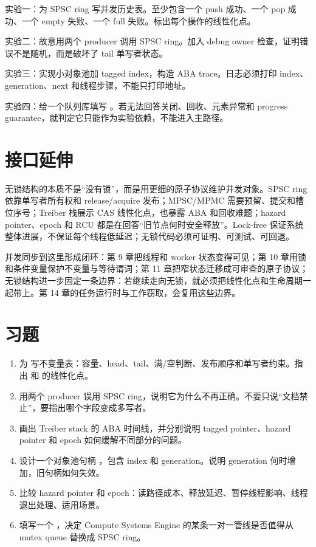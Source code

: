 \begin{exercisebox}
实验一：为 SPSC ring 写并发历史表。至少包含一个 push 成功、一个 pop 成功、一个 empty 失败、一个 full 失败。标出每个操作的线性化点。

实验二：故意用两个 producer 调用 SPSC ring。加入 debug owner 检查，证明错误不是随机，而是破坏了 tail 单写者状态。

实验三：实现小对象池加 tagged index，构造 ABA trace。日志必须打印 index、generation、next 和线程步骤，不能只打印地址。

实验四：给一个队列库填写 。若无法回答关闭、回收、元素异常和 progress guarantee，就判定它只能作为实验依赖，不能进入主路径。
\end{exercisebox}

\section{接口延伸}

无锁结构的本质不是“没有锁”，而是用更细的原子协议维护并发对象。SPSC ring 依靠单写者所有权和 release/acquire 发布；MPSC/MPMC 需要预留、提交和槽位序号；Treiber 栈展示 CAS 线性化点，也暴露 ABA 和回收难题；hazard pointer、epoch 和 RCU 都是在回答“旧节点何时安全释放”。Lock-free 保证系统整体进展，不保证每个线程低延迟；无锁代码必须可证明、可测试、可回退。

并发同步到这里形成闭环：第 9 章把线程和 worker 状态变得可见；第 10 章用锁和条件变量保护不变量与等待谓词；第 11 章把窄状态迁移成可审查的原子协议；无锁结构进一步固定一条边界：若继续走向无锁，就必须把线性化点和生命周期一起带上。第 14 章的任务运行时与工作窃取，会复用这些边界。

\section{习题}

\begin{exercisebox}
\begin{enumerate}
  \item 为  写不变量表：容量、head、tail、满/空判断、发布顺序和单写者约束。指出  和  的线性化点。
  \item 用两个 producer 误用 SPSC ring，说明它为什么不再正确。不要只说“文档禁止”，要指出哪个字段变成多写者。
  \item 画出 Treiber stack 的 ABA 时间线，并分别说明 tagged pointer、hazard pointer 和 epoch 如何缓解不同部分的问题。
  \item 设计一个对象池句柄 ，包含 index 和 generation。说明 generation 何时增加，旧句柄如何失效。
  \item 比较 hazard pointer 和 epoch：读路径成本、释放延迟、暂停线程影响、线程退出处理、适用场景。
  \item 填写一个 ，决定 Compute Systems Engine 的某条一对一管线是否值得从 mutex queue 替换成 SPSC ring。
\end{enumerate}
\end{exercisebox}
